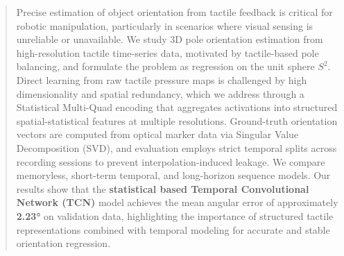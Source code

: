 \documentclass{article}
\begin{document}

\printAffiliationsAndNotice{\icmlEqualContribution} 

\begin{abstract}
    Precise estimation of object orientation from tactile feedback is critical for robotic manipulation, particularly in scenarios where visual sensing is unreliable or unavailable. We study 3D pole orientation estimation from high-resolution tactile time-series data, motivated by tactile-based pole balancing, and formulate the problem as regression on the unit sphere $S^2$. Direct learning from raw tactile pressure maps is challenged by high dimensionality and spatial redundancy, which we address through a Statistical Multi-Quad encoding that aggregates activations into structured spatial-statistical features at multiple resolutions. Ground-truth orientation vectors are computed from optical marker data via Singular Value Decomposition (SVD), and evaluation employs strict temporal splits across recording sessions to prevent interpolation-induced leakage. We compare memoryless, short-term temporal, and long-horizon sequence models. Our results show that the \textbf{statistical based Temporal Convolutional Network (TCN)} model achieves the mean angular error of approximately \textbf{2.23°} on validation data, highlighting the importance of structured tactile representations combined with temporal modeling for accurate and stable orientation regression.
    \end{abstract}
\end{document}

